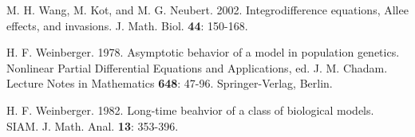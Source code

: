 \documentclass[11pt]{article}
\theoremstyle{definition}
\numberwithin{equation}{section}
\numberwithin{thm}{section}
\begin{document}
\begin{thebibliography}{9}
 M. H. Wang, M. Kot, and M. G. Neubert. 2002.
Integrodifference equations, Allee effects, and invasions.
J. Math. Biol. {\bf 44}: 150-168.

 H. F. Weinberger. 1978.
Asymptotic behavior of a model in population genetics.
Nonlinear Partial Differential Equations and Applications, ed. J. M. Chadam. Lecture Notes in Mathematics {\bf 648}: 47-96. Springer-Verlag, Berlin.

 H. F. Weinberger. 1982.
Long-time beahvior of a class of biological models.
SIAM. J. Math. Anal. {\bf 13}: 353-396.
\end{thebibliography}
\end{document}
